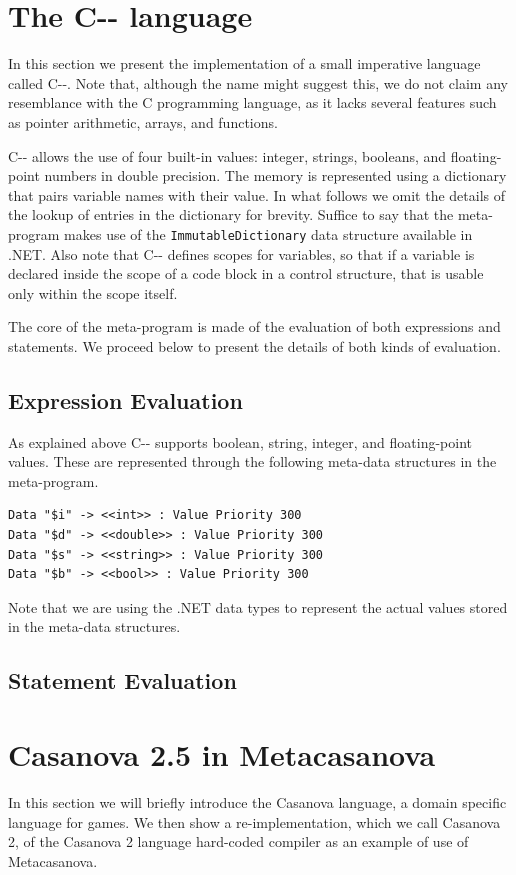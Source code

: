 \section{The C-{}- language}
In this section we present the implementation of a small imperative language called C-{}-. Note that, although the name might suggest this, we do not claim any resemblance with the C programming language, as it lacks several features such as pointer arithmetic, arrays, and functions.

C-{}- allows the use of four built-in values: integer, strings, booleans, and floating-point numbers in double precision. The memory is represented using a dictionary that pairs variable names with their value. In what follows we omit the details of the lookup of entries in the dictionary for brevity. Suffice to say that the meta-program makes use of the \texttt{ImmutableDictionary} data structure available in .NET. Also note that C-{}- defines scopes for variables, so that if a variable is declared inside the scope of a code block in a control structure, that is usable only within the scope itself.

The core of the meta-program is made of the evaluation of both expressions and statements. We proceed below to present the details of both kinds of evaluation.

\subsection{Expression Evaluation}
As explained above C-{}- supports boolean, string, integer, and floating-point values. These are represented through the following meta-data structures in the meta-program.

\begin{lstlisting}
Data "$i" -> <<int>> : Value Priority 300
Data "$d" -> <<double>> : Value Priority 300
Data "$s" -> <<string>> : Value Priority 300
Data "$b" -> <<bool>> : Value Priority 300
\end{lstlisting}

\noindent
Note that we are using the .NET data types to represent the actual values stored in the meta-data structures.

\subsection{Statement Evaluation}

\section{Casanova 2.5 in Metacasanova}
In this section we will briefly introduce the Casanova language, a domain specific language for games. We then show a re-implementation, which we call Casanova 2, of the Casanova 2 language hard-coded compiler as an example of use of Metacasanova.


